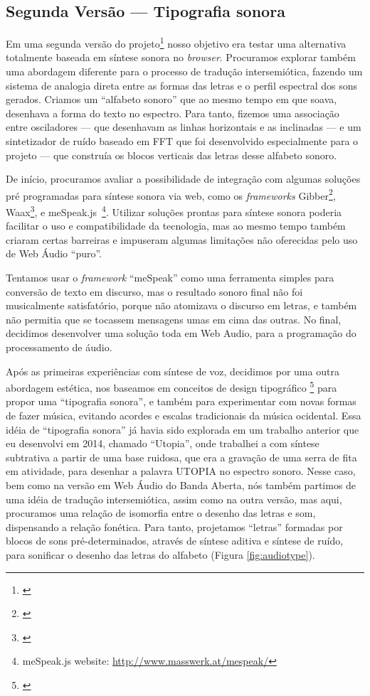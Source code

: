 \subsection{Segunda Versão --- Tipografia sonora}
Em uma segunda versão do projeto\footnote{\cite{Stolfi2017w}} nosso objetivo era testar uma alternativa totalmente baseada em síntese sonora no \emph{browser}. Procuramos explorar também uma abordagem diferente para o processo de tradução intersemiótica, fazendo um sistema de analogia direta entre as formas das letras e o perfil espectral dos sons gerados. Criamos um ``alfabeto sonoro'' que ao mesmo tempo em que soava, desenhava a forma do texto no espectro. Para tanto, fizemos uma associação entre osciladores --- que desenhavam as linhas horizontais e as inclinadas --- e um sintetizador de ruído baseado em FFT que foi desenvolvido especialmente para o projeto --- que construía os blocos verticais das letras desse alfabeto sonoro.


De início, procuramos avaliar a possibilidade de integração com algumas soluções pré programadas para síntese sonora via web, como os \emph{frameworks} Gibber\footnote{\cite{Roberts2012gibberlivecoding}}, Waax\footnote{\cite{Choi2013waax}}, e meSpeak.js~\footnote{meSpeak.js website: \url{http://www.masswerk.at/mespeak/}}. Utilizar soluções prontas para síntese sonora poderia facilitar o uso e compatibilidade da tecnologia, mas ao mesmo tempo também criaram certas barreiras e impuseram algumas limitações não oferecidas pelo uso de Web Áudio ``puro''. 

Tentamos usar o \emph{framework} ``meSpeak'' como uma ferramenta simples para conversão de texto em discurso, mas o resultado sonoro final não foi musicalmente satisfatório, porque não atomizava o discurso em letras, e também não permitia que se tocassem mensagens umas em cima das outras. No final, decidimos desenvolver uma solução toda em Web Audio, para a programação do processamento de áudio.


Após as primeiras experiências com síntese de voz, decidimos por uma outra abordagem estética, nos baseamos em conceitos de design tipográfico \footnote{\cite{ruder_typography:_2009}} para propor uma ``tipografia sonora'', e também para experimentar com novas formas de fazer música, evitando acordes e escalas tradicionais da música ocidental. Essa idéia de ``tipografia sonora'' já havia sido explorada em um trabalho anterior que eu desenvolvi em 2014, chamado ``Utopia'', onde trabalhei a com síntese subtrativa a partir de uma base ruidosa, que era a gravação de uma serra de fita em atividade, para desenhar a palavra UTOPIA no espectro sonoro. Nesse caso, bem como na versão em Web Áudio do Banda Aberta, nós também partimos de uma idéia de tradução intersemiótica, assim como na outra versão, mas aqui, procuramos uma relação de isomorfia entre o desenho das letras e som, dispensando a relação fonética. Para tanto, projetamos ``letras'' formadas por blocos de sons pré-determinados, através de síntese aditiva e síntese de ruído, para sonificar o desenho das letras do alfabeto (Figura \ref{fig:audiotype}).

